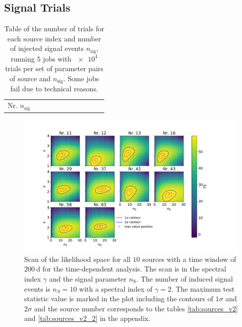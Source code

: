 \newpage
\subsection{Signal Trials}

\begin{table}
  \centering
  \caption{Table of the number of trials for each source index and number of injected signal events $n_\text{sig}$, running $\num{5}$ jobs with $\num{e4}$ trials per set of parameter pairs of source and $n_\text{sig}$. Some jobs fail due to technical reasons.}
  \label{tab:trials_sig_time_dep_table}
  \begin{tabular}{>{\centering\arraybackslash}p{.9cm}|%
                    cccccccccc}
    \toprule
    \: Nr. \newline $n_\text{sig}$ \: & 
    \toprule
    
    \toprule
  \end{tabular}
\end{table}

\begin{figure}
    \centering
    \includegraphics[width=16cm]{Plots/appendix/llh_scan.pdf}
    \caption{Scan of the likelihood space for all $\num{10}$ sources with a time window of $\SI{200}{\day}$ for the time-dependent analysis. The scan is in the spectral index $\gamma$ and the signal parameter $n_\text{S}$. The number of induced signal events is $n_S = \num{10}$ with a spectral index of $\gamma = 2$. The maximum test statistic value is marked in the plot including the contours of $\num{1}\sigma$ and $\num{2}\sigma$ and the source number corresponds to the tables \ref{tab:sources_v2} and \ref{tab:sources_v2_2} in the appendix.}
    \label{fig:llh_scan_time_dep_all}
\end{figure}

